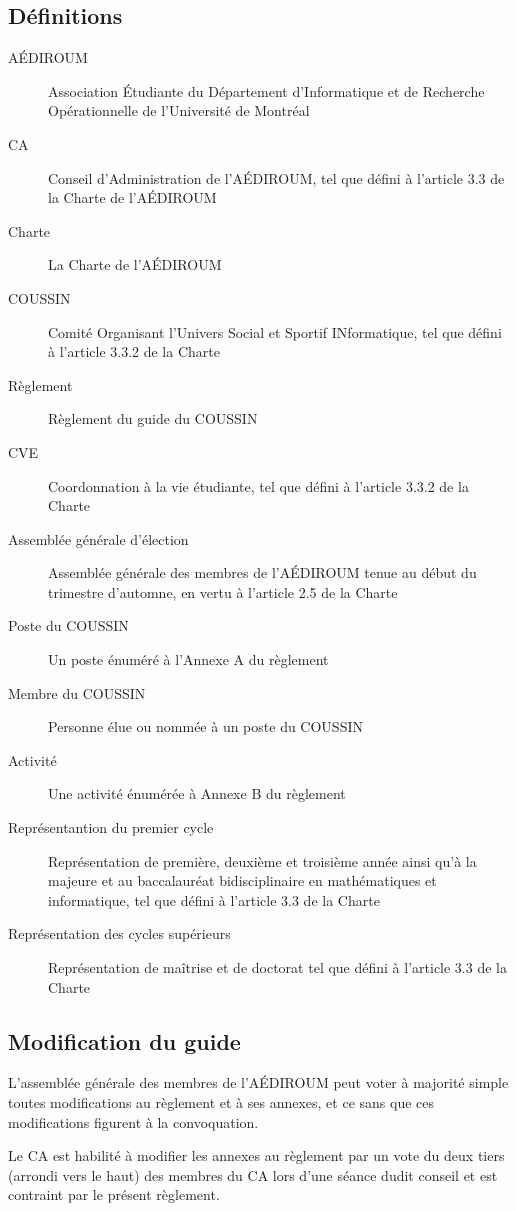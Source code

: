 \documentclass{aediroum}
\begin{document}
\subsection{Définitions}
\begin{description}
	\item[AÉDIROUM] Association Étudiante du Département d'Informatique et de Recherche Opérationnelle de l'Université de Montréal
	\item[CA] Conseil d'Administration de l'AÉDIROUM, tel que défini à l'article 3.3 de la Charte de l'AÉDIROUM
	\item[Charte] La Charte de l'AÉDIROUM
	\item[COUSSIN] Comité Organisant l'Univers Social et Sportif INformatique, tel que défini à l'article 3.3.2 de la Charte
	\item[Règlement] Règlement du guide du COUSSIN
	\item[CVE] Coordonnation à la vie étudiante, tel que défini à l'article 3.3.2 de la Charte
	\item[Assemblée générale d'élection] Assemblée générale des membres de l'AÉDIROUM tenue au début du trimestre d'automne, en vertu à l'article 2.5 de la Charte
	\item[Poste du COUSSIN] Un poste énuméré à l'Annexe A du règlement
	\item[Membre du COUSSIN] Personne élue ou nommée à un poste du COUSSIN
	\item[Activité] Une activité énumérée à Annexe B du règlement
	\item[Représentantion du premier cycle] Représentation de première, deuxième et troisième année ainsi qu'à la majeure et au baccalauréat bidisciplinaire en mathématiques et informatique, tel que défini à l'article 3.3 de la Charte
	\item[Représentation des cycles supérieurs] Représentation de maîtrise et de doctorat tel que défini à l'article 3.3 de la Charte
\end{description}

\subsection{Modification du guide}
L'assemblée générale des membres de l'AÉDIROUM peut voter à majorité simple toutes modifications au règlement et à ses annexes, et ce sans que ces modifications figurent à la convoquation.

Le CA est habilité à modifier les annexes au règlement par un vote du deux tiers (arrondi vers le haut) des membres du CA lors d'une séance dudit conseil et est contraint par le présent règlement.
\end{document}

